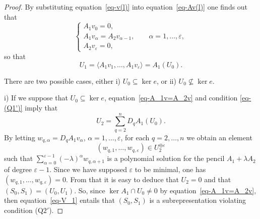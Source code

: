 \documentclass[11pt]{article}
\numberwithin{equation}{section}
\numberwithin{equation}{section}
\begin{document}
\begin{proof}
By substituting equation~\eqref{eq-v(l)} into equation~\eqref{eq-Av(l)} one finds out that
\begin{equation}
 \begin{cases}
A_{1}v_{0} =0,\\
A_{1}v_{\alpha} =A_{2}v_{\alpha-1},\qquad \alpha=1,\dots,\varepsilon,\\
A_{2}v_{\varepsilon} =0,
\end{cases}
\label{eq-A_1v=A_2v}
\end{equation}
so that
\begin{equation}
U_{1}=\langle A_{1}v_{1},\dots,A_{1}v_{\varepsilon} \rangle=A_{1}(U_{0}) .
\label{eq-V_1}
\end{equation}

There are two possible cases, either i) $U_{0}\subseteq\ker e$, or ii) $U_{0}\not\subseteq\ker e$.

i) If we suppose that
$U_{0}\subseteq\ker e$,
equation~\eqref{eq-A_1v=A_2v} and condition \eqref{eq-(Q1')} imply that
\begin{equation*}
U_{2}=\sum_{q=2}^{n}D_{q}A_{1}(U_{0}) .
\end{equation*}
By letting $w_{q,\alpha}=D_{q}A_{1}v_{\alpha}$, $\alpha=1,\dots,\varepsilon$,
for each $q=2,\dots,n$ we obtain an
 element \[(w_{q,1},\dots,w_{q,\varepsilon})\in U_2^{\oplus\varepsilon} \]
 such that $\sum\limits_{\alpha=0}^{\varepsilon-1}(-\lambda)^{\alpha}w_{q,\alpha+1}$ is a polynomial solution for the pencil $A_{1}+\lambda A_{2}$ of degree $\varepsilon - 1$. Since we have supposed $\varepsilon$ to be minimal, one has
 $(w_{q,1},\dots,w_{q,\varepsilon}) = 0$. From that it is easy to deduce that $U_2 =0$ and that $(S_0, S_1) = (U_0,U_1)$.
 So, since $\ker A_1 \cap U_0 \neq 0$ by equation~\eqref{eq-A_1v=A_2v}, then
 equation~\eqref{eq-V_1} entails that $(S_{0},S_{1})$ is a subrepresentation violating condition (Q$2'$).


\end{proof}
\end{document}
